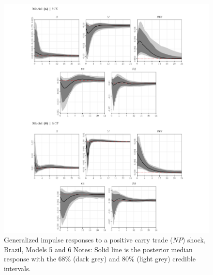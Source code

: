 \documentclass[a4paper, twoside]{templates/ociamthesis}
\begin{document}
\begin{figure}[!ht]

{\centering \includegraphics[width=0.99\columnwidth]{figure/g.MODEL56.NPHIGHER.TARGET.BR} 

}

\caption[Generalized impulse responses to a positive carry trade ($NP$) shock, Brazil, Models 5 and 6]{Generalized impulse responses to a positive carry trade ($NP$) shock, Brazil, Models 5 and 6 \newline \scriptsize Notes: Solid line is the posterior median response with the 68\% (dark grey) and 80\% (light grey) credible intervals.}\label{fig:Figure55}
\end{figure}

\clearpage
\end{document}
